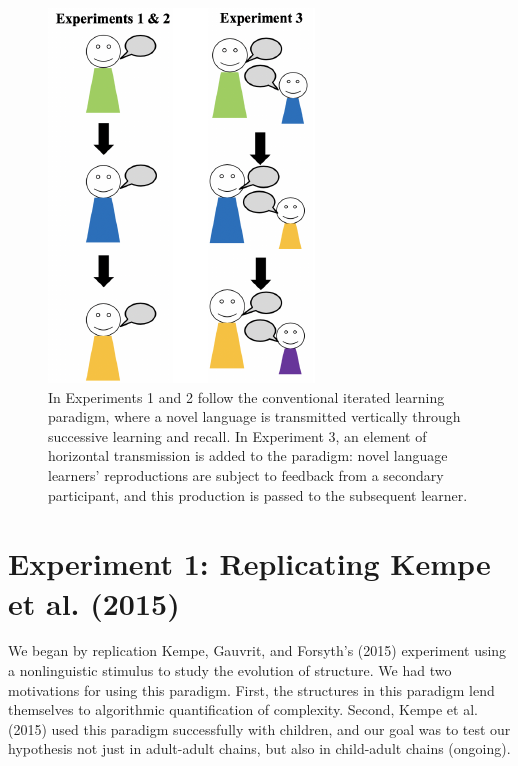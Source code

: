 \documentclass[10pt, letterpaper]{article}
\newenvironment{CodeChunk}{}{}
\begin{document}
\begin{CodeChunk}
\begin{figure}[tb]

{\centering \includegraphics{figs/baseline_schem-1} 

}

\caption[In Experiments 1 and 2 follow the conventional iterated learning paradigm, where a novel language is transmitted vertically through successive learning and recall]{In Experiments 1 and 2 follow the conventional iterated learning paradigm, where a novel language is transmitted vertically through successive learning and recall. In Experiment 3, an element of horizontal transmission is added to the paradigm: novel language learners' reproductions are subject to feedback from a secondary participant, and this production is passed to the subsequent learner.}\label{fig:baseline_schem}
\end{figure}
\end{CodeChunk}

\hypertarget{experiment-1-replicating-kempe-2015}{%
\section{Experiment 1: Replicating Kempe et al.
(2015)}\label{experiment-1-replicating-kempe-2015}}

We began by replication Kempe, Gauvrit, and Forsyth's (2015) experiment
using a nonlinguistic stimulus to study the evolution of structure. We
had two motivations for using this paradigm. First, the structures in
this paradigm lend themselves to algorithmic quantification of
complexity. Second, Kempe et al. (2015) used this paradigm successfully
with children, and our goal was to test our hypothesis not just in
adult-adult chains, but also in child-adult chains (ongoing).
\end{document}

